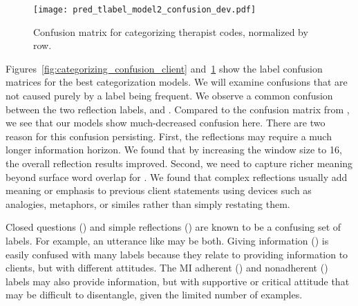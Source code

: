 \begin{figure}[!th]
\centering

  \texttt{[image: pred\_tlabel\_model2\_confusion\_dev.pdf]}
  \caption{\label{fig:categorizing_confusion_therapist} Confusion matrix for categorizing therapist codes, normalized by row.}
\end{figure}

Figures~\ref{fig:categorizing_confusion_client} and~\ref{fig:categorizing_confusion_therapist} show the
label confusion matrices for the best categorization models. We will
examine confusions that are not caused purely by a label being
frequent. We observe a common confusion between
the two reflection labels, \REC and \RES. Compared to the
confusion matrix from \citet{xiao2016behavioral}, we see that our
models show much-decreased confusion here. There are two reason for
this confusion persisting. First, the reflections may require a much
longer information horizon. We found that by increasing the window
size to 16, the overall reflection results improved. Second, we need
to capture richer meaning beyond surface word overlap for
\RES. We found that
complex reflections usually add meaning or emphasis  to
previous client statements using devices such as analogies,
metaphors, or similes rather than simply restating them. %

%
Closed questions (\QUC) and simple reflections (\RES) are known to
be a confusing set of labels. For example, an utterance like
 may be both.
%
Giving information (\GI)
is easily confused with many labels because they relate to providing
information to clients, but with different attitudes. The MI adherent
(\MIA) and nonadherent (\MIN) labels may also provide information,
but with supportive or critical attitude that may be difficult to
disentangle, given the limited number of examples.


